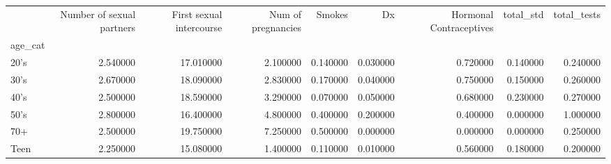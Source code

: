 \begin{tabular}{lrrrrrrrr}
\toprule
 & Number of sexual partners & First sexual intercourse & Num of pregnancies & Smokes & Dx & Hormonal Contraceptives & total_std & total_tests \\
age_cat &  &  &  &  &  &  &  &  \\
\midrule
20's & 2.540000 & 17.010000 & 2.100000 & 0.140000 & 0.030000 & 0.720000 & 0.140000 & 0.240000 \\
30's & 2.670000 & 18.090000 & 2.830000 & 0.170000 & 0.040000 & 0.750000 & 0.150000 & 0.260000 \\
40's & 2.500000 & 18.590000 & 3.290000 & 0.070000 & 0.050000 & 0.680000 & 0.230000 & 0.270000 \\
50's & 2.800000 & 16.400000 & 4.800000 & 0.400000 & 0.200000 & 0.400000 & 0.000000 & 1.000000 \\
70+ & 2.500000 & 19.750000 & 7.250000 & 0.500000 & 0.000000 & 0.000000 & 0.000000 & 0.250000 \\
Teen & 2.250000 & 15.080000 & 1.400000 & 0.110000 & 0.010000 & 0.560000 & 0.180000 & 0.200000 \\
\bottomrule
\end{tabular}
